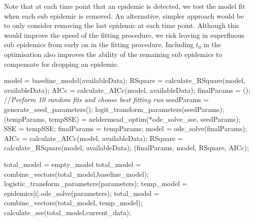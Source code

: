 Note that at each time point that an epidemic is detected, we test the
model fit when each sub epidemic is removed. An alternative, simpler
approach would be to only consider removing the last epidemic at each
time point. Although this would improve the speed of the fitting
procedure, we risk leaving in superfluous sub epidemics from early on
in the fitting procedure. Including $t_0$ in the optimisation also
improves the ability of the remaining sub epidemics to compensate for
dropping an epidemic.

\begin{algorithm}
  \begin{algorithmic}
    \State model = baseline\_model(availableData);
    \State RSquare = calculate\_RSquare(model, availableData);
    \State AICc = calculate\_AICc(model, availableData);
    \State finalParams = ();
    \Else
    \State//\emph{Perform 10 random fits and choose best fitting run}
    \State seedParams = generate\_seed\_parameters();
    \State logit\_transform\_parameters(seedParams);
    \State (tempParams, tempSSE) = neldermead\_optim(*ode\_solve\_sse, seedParams);
    \State SSE = tempSSE;
    \State finalParams = tempParams;
    \EndIf
    \EndFor
    \State model = ode\_solve(finalParams);
    \State AICc = calculate\_AICc(model, availableData);
    \State RSquare = calculate\_RSquare(model, availableData);
    \Return (finalParams, model, RSquare, AICc);
    \EndIf
    \EndFunction
  \end{algorithmic}
\label{fig:optimise}
\end{algorithm}


\begin{algorithm}
  \begin{algorithmic}
    \State total\_model = empty\_model
    \State total\_model = combine\_vectors(total\_model,baseline\_model);
    \State logistic\_transform\_parameters(parameters);
    \State temp\_model = epidemics[i].ode\_solve(parameters);
    \State total\_model = combine\_vectors(total\_model,
    temp\_model);
    \EndFor
    \Return calculate\_sse(total\_model,current\_data);
    \EndFunction
    \end{algorithmic}
  \label{fig:objective}
\end{algorithm}
    
